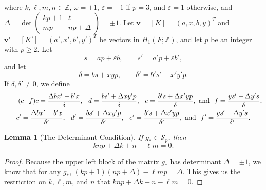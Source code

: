 \documentclass{amsart}     %
\newtheorem{lem}[thm]{Lemma}          %
\theoremstyle{definition}
\begin{document}
where $k, \ell, m, n \in \mathbb{Z}$, $\omega = \pm 1$, $\varepsilon = -1$ if $p = 3$, and $\varepsilon = 1$ otherwise, and $\Delta = \det \begin{pmatrix} kp+1 & \ell \\ mp & np + \Delta \end{pmatrix} = \pm 1$. Let $\textbf{v} = [K] = (a, x, b, y)^T$ and $\textbf{v}' = [K'] = (a', x', b', y')^T$ be vectors in $H_1(F; \mathbb{Z})$, and let $p$ be an integer with $p \ge 2$. Let \begin{equation} \tag{$s$} \label{eqn:s} s = ap+ \varepsilon b, \qquad s' = a'p + \varepsilon b',\end{equation}
 and let  
 \begin{equation} \tag{$\delta$} \label{eqn:delta} \delta = bs + xyp, \qquad \delta ' = b's' + x'y'p. \end{equation} 
 If $\delta, \delta' \neq 0$, we define 
 \begin{multline} \tag{$c{-}f$} \label{eqn:cdef} c = \frac{\Delta bx' - b'x}{\delta}, \hspace{.1in} d = \frac{bs' + \Delta xy'p}{\delta}, \hspace{.1in} e = \frac{ b's + \Delta x' y p}{\delta}, \mbox{ and } \hspace{.05in} f= \frac{ys' - \Delta y's}{\delta}, \\ c' = \frac{\Delta bx' - b'x}{\delta'}, \hspace{.1in} d' = \frac{bs' + \Delta xy'p}{\delta'}, \hspace{.1in}  e' = \frac{b's+ \Delta x' y p }{\delta'}, \mbox{ and } \hspace{.05in}  f'= \frac{ys' - \Delta y's}{\delta'}.\end{multline} 



\begin{lem}[The Determinant Condition]
If $g_* \in \mathcal S_p$, then $$knp + \Delta k + n -\ell m = 0.$$
\end{lem}

\begin{proof}
Because the upper left block of the matrix $g_*$ has determinant $\Delta = \pm 1$, we know that for any $g_*$, $(kp+1)(np+\Delta) - \ell mp = \Delta$. This gives us the restriction on $k,\ell,m$, and $n$ that $knp + \Delta k + n -\ell m = 0$. \end{proof}
\end{document}
